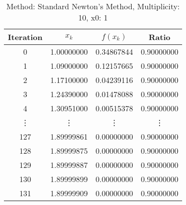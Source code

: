 \begin{table}
\centering
\caption{Method: Standard Newton's Method, Multiplicity: 10, x0: 1}
\label{tab:table_Standard_Newton's_Method_10_1}
\begin{tabular}{c c c c}
\toprule
Iteration &      $x_k$ &   $f(x_k)$ &      Ratio \\
\midrule
        0 & 1.00000000 & 0.34867844 & 0.90000000 \\
        1 & 1.09000000 & 0.12157665 & 0.90000000 \\
        2 & 1.17100000 & 0.04239116 & 0.90000000 \\
        3 & 1.24390000 & 0.01478088 & 0.90000000 \\
        4 & 1.30951000 & 0.00515378 & 0.90000000 \\
   \vdots &     \vdots &     \vdots &     \vdots \\
      127 & 1.89999861 & 0.00000000 & 0.90000000 \\
      128 & 1.89999875 & 0.00000000 & 0.90000000 \\
      129 & 1.89999887 & 0.00000000 & 0.90000000 \\
      130 & 1.89999899 & 0.00000000 & 0.90000000 \\
      131 & 1.89999909 & 0.00000000 & 0.90000000 \\
\bottomrule
\end{tabular}
\end{table}
